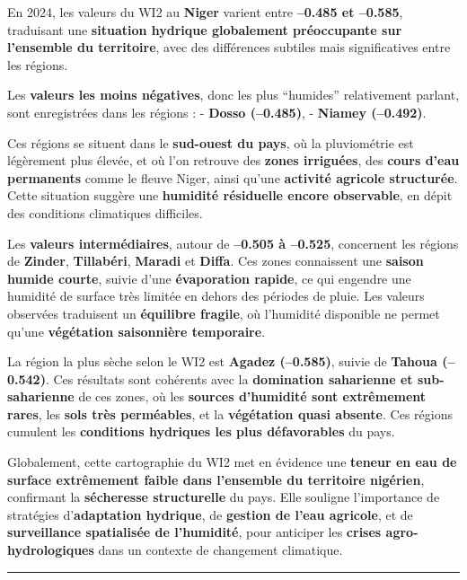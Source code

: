 \documentclass[
]{book}
\begin{document}
En 2024, les valeurs du WI2 au \textbf{Niger} varient entre \textbf{--0.485 et --0.585}, traduisant une \textbf{situation hydrique globalement préoccupante sur l'ensemble du territoire}, avec des différences subtiles mais significatives entre les régions.

Les \textbf{valeurs les moins négatives}, donc les plus ``humides'' relativement parlant, sont enregistrées dans les régions :
- \textbf{Dosso (--0.485)},
- \textbf{Niamey (--0.492)}.

Ces régions se situent dans le \textbf{sud-ouest du pays}, où la pluviométrie est légèrement plus élevée, et où l'on retrouve des \textbf{zones irriguées}, des \textbf{cours d'eau permanents} comme le fleuve Niger, ainsi qu'une \textbf{activité agricole structurée}. Cette situation suggère une \textbf{humidité résiduelle encore observable}, en dépit des conditions climatiques difficiles.

Les \textbf{valeurs intermédiaires}, autour de \textbf{--0.505 à --0.525}, concernent les régions de \textbf{Zinder}, \textbf{Tillabéri}, \textbf{Maradi} et \textbf{Diffa}. Ces zones connaissent une \textbf{saison humide courte}, suivie d'une \textbf{évaporation rapide}, ce qui engendre une humidité de surface très limitée en dehors des périodes de pluie. Les valeurs observées traduisent un \textbf{équilibre fragile}, où l'humidité disponible ne permet qu'une \textbf{végétation saisonnière temporaire}.

La région la plus sèche selon le WI2 est \textbf{Agadez (--0.585)}, suivie de \textbf{Tahoua (--0.542)}. Ces résultats sont cohérents avec la \textbf{domination saharienne et sub-saharienne} de ces zones, où les \textbf{sources d'humidité sont extrêmement rares}, les \textbf{sols très perméables}, et la \textbf{végétation quasi absente}. Ces régions cumulent les \textbf{conditions hydriques les plus défavorables} du pays.

Globalement, cette cartographie du WI2 met en évidence une \textbf{teneur en eau de surface extrêmement faible dans l'ensemble du territoire nigérien}, confirmant la \textbf{sécheresse structurelle} du pays. Elle souligne l'importance de stratégies d'\textbf{adaptation hydrique}, de \textbf{gestion de l'eau agricole}, et de \textbf{surveillance spatialisée de l'humidité}, pour anticiper les \textbf{crises agro-hydrologiques} dans un contexte de changement climatique.

\begin{center}\rule{0.5\linewidth}{0.5pt}\end{center}
\end{document}
